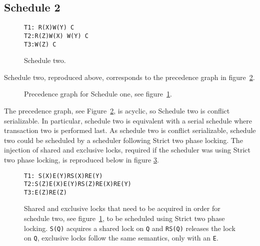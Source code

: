 \documentclass[a4paper]{article}
\begin{document}
\subsection*{Schedule 2}
\begin{figure}[h!]
\texttt{T1: R(X)\hspace{150pt}W(Y) C\\
T2:\hspace{130pt}R(Z)\hspace{120pt}W(X) W(Y) C\\
T3:\hspace{50pt}W(Z) C}
\caption{Schedule two.}
\label{sch2}
\end{figure}
Schedule two, reproduced above, corresponds to the precedence graph in figure~\ref{p2}.
\begin{figure}[h!]
\centering
{}
\caption{Precedence graph for Schedule one, see figure~\ref{sch2}.}
\label{p2}
\end{figure}
The precedence graph, see Figure~\ref{p2}, is acyclic, so Schedule two is conflict serializable. In particular, schedule two is equivalent with a serial schedule where transaction two is performed last. As schedule two is conflict serializable, schedule two could be scheduled by a scheduler following Strict two phase locking. The injection of shared and exclusive locks, required if the scheduler was using Strict two phase locking, is reproduced below in figure \ref{locks}.
\begin{figure}[h!]
\texttt{T1: S(X)\hspace{95pt}E(Y)RS(X)RE(Y)\\
T2:\hspace{105pt}S(Z)\hspace{90pt}E(X)E(Y)RS(Z)RE(X)RE(Y)\\
T3:\hspace{50pt}E(Z)RE(Z)}
\caption{Shared and exclusive locks that need to be acquired in order for schedule two, see figure~\ref{sch2}, to be scheduled using Strict two phase locking. \texttt{S(Q)} acquires a shared lock on \texttt{Q} and \texttt{RS(Q)} releases the lock on \texttt{Q}, exclusive locks follow the same semantics, only with an \texttt{E}.}
\label{locks}
\end{figure}
\end{document}
